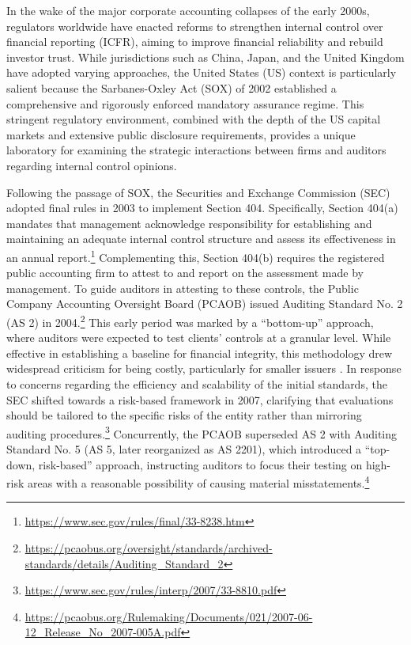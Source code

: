 \documentclass[12pt, a4paper]{report}
\begin{document}
In the wake of the major corporate accounting collapses of the early 2000s, regulators worldwide have enacted reforms to strengthen internal control over financial reporting (ICFR), aiming to improve financial reliability and rebuild investor trust. While jurisdictions such as China, Japan, and the United Kingdom have adopted varying approaches, the United States (US) context is particularly salient because the Sarbanes-Oxley Act (SOX) of 2002 established a comprehensive and rigorously enforced mandatory assurance regime. This stringent regulatory environment, combined with the depth of the US capital markets and extensive public disclosure requirements, provides a unique laboratory for examining the strategic interactions between firms and auditors regarding internal control opinions.

Following the passage of SOX, the Securities and Exchange Commission (SEC) adopted final rules in 2003 to implement Section 404. Specifically, Section 404(a) mandates that management acknowledge responsibility for establishing and maintaining an adequate internal control structure and assess its effectiveness in an annual report.\footnote{\url{https://www.sec.gov/rules/final/33-8238.htm}} Complementing this, Section 404(b) requires the registered public accounting firm to attest to and report on the assessment made by management. To guide auditors in attesting to these controls, the Public Company Accounting Oversight Board (PCAOB) issued Auditing Standard No. 2 (AS 2) in 2004.\footnote{\url{https://pcaobus.org/oversight/standards/archived-standards/details/Auditing_Standard_2}} This early period was marked by a ``bottom-up'' approach, where auditors were expected to test clients' controls at a granular level. While effective in establishing a baseline for financial integrity, this methodology drew widespread criticism for being costly, particularly for smaller issuers \citep{krishnanCostsComplySOX2008, gohAuditorReportingSection2013}. In response to concerns regarding the efficiency and scalability of the initial standards, the SEC shifted towards a risk-based framework in 2007, clarifying that evaluations should be tailored to the specific risks of the entity rather than mirroring auditing procedures.\footnote{\url{https://www.sec.gov/rules/interp/2007/33-8810.pdf}} Concurrently, the PCAOB superseded AS 2 with Auditing Standard No. 5 (AS 5, later reorganized as AS 2201), which introduced a ``top-down, risk-based'' approach, instructing auditors to focus their testing on high-risk areas with a reasonable possibility of causing material misstatements.\footnote{\url{https://pcaobus.org/Rulemaking/Documents/021/2007-06-12_Release_No_2007-005A.pdf}}
\end{document}
